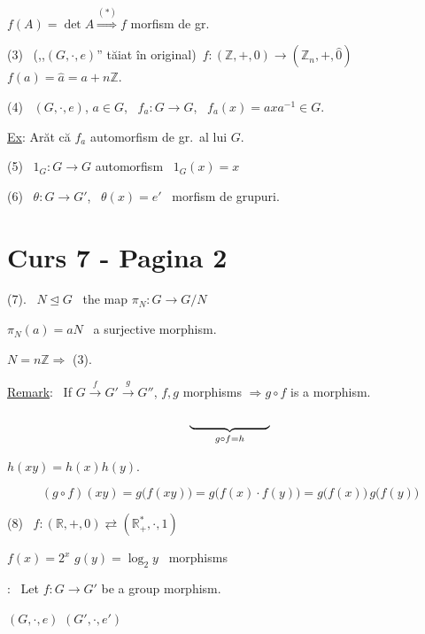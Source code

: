 \noindent $f(A) = \det A \overset{(*)}{\Longrightarrow} f$ morfism de gr.

\bigskip
\noindent (3) \ \footnotesize (,,$(G,\cdot,e)$'' tăiat în original)\normalsize \ $f:(\mathbb{Z},+,0) \to (\mathbb{Z}_n,+,\hat 0)$ \quad $f(a)=\hat a = a+n\mathbb{Z}$.

\bigskip
\noindent (4) \ $(G,\cdot,e)$, $a\in G$, \ $f_a:G\to G$, \ $f_a(x)=axa^{-1}\in G$.

\noindent\underline{Ex}: Arăt că $f_a$ automorfism de gr.\ al lui $G$.

\bigskip
\noindent (5) \ $1_G: G\to G$ automorfism \ $1_G(x)=x$

\bigskip
\noindent (6) \ $\theta:G\to G'$, \ $\theta(x)=e'$ \ morfism de grupuri.




\section*{Curs 7 - Pagina 2}

\noindent (7). \ $N\trianglelefteq G$ \ the map $\pi_N: G\to G/N$

\noindent $\pi_N(a)=aN$ \ a surjective morphism.

\bigskip
\noindent $N=n\mathbb{Z} \Rightarrow$ (3).

\bigskip
\noindent\underline{Remark}: \ If $G \xrightarrow{f} G' \xrightarrow{g} G''$, $f,g$ morphisms $\Rightarrow g\circ f$ is a morphism.

\[
\underbrace{\hphantom{G \xrightarrow{f} G' \xrightarrow{g} G''}}_{g\circ f = h}
\]

\noindent $h(xy) = h(x)h(y)$.

\[
(g\circ f)(xy) = g\big(f(xy)\big) = g\big(f(x)\cdot f(y)\big) = g\big(f(x)\big)\,g\big(f(y)\big)
\]

\bigskip
\noindent (8) \ $f:(\mathbb{R},+,0) \rightleftarrows (\mathbb{R}_+^*,\cdot,1)$

\noindent $f(x)=2^x$ \qquad $g(y)=\log_2 y$ \ morphisms

\bigskip
\noindent{}: \ Let $f:G\to G'$ be a group morphism.

\noindent $(G,\cdot,e)$ \qquad $(G',\cdot,e')$

